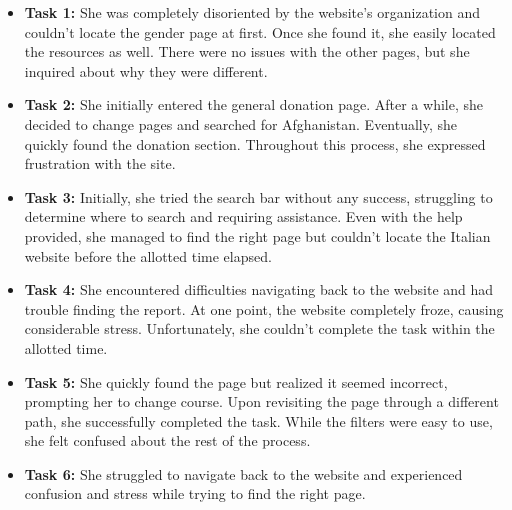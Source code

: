 \begin{itemize}
    \item \textbf{Task 1:} She was completely disoriented by the website's organization and couldn't locate the gender page at first. Once she found it, she easily located the resources as well. There were no issues with the other pages, but she inquired about why they were different.
    \item \textbf{Task 2:} She initially entered the general donation page. After a while, she decided to change pages and searched for Afghanistan. Eventually, she quickly found the donation section. Throughout this process, she expressed frustration with the site.
    \item \textbf{Task 3:} Initially, she tried the search bar without any success, struggling to determine where to search and requiring assistance. Even with the help provided, she managed to find the right page but couldn't locate the Italian website before the allotted time elapsed.
    \item \textbf{Task 4:} She encountered difficulties navigating back to the website and had trouble finding the report. At one point, the website completely froze, causing considerable stress. Unfortunately, she couldn't complete the task within the allotted time.
    \item \textbf{Task 5:} She quickly found the page but realized it seemed incorrect, prompting her to change course. Upon revisiting the page through a different path, she successfully completed the task. While the filters were easy to use, she felt confused about the rest of the process.
    \item \textbf{Task 6:} She struggled to navigate back to the website and experienced confusion and stress while trying to find the right page.
\end{itemize}




\vspace{1cm}

